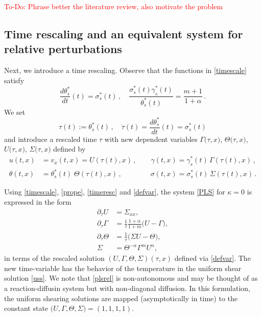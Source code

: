 \documentclass[a4paper,11pt]{article}
\newcommand{\tcr}{\textcolor{red}}
\theoremstyle{remark}
\begin{document}
\tcr{To-Do:  Phrase better the literature review, also motivate the problem}

\subsection{Time rescaling and an equivalent system for relative perturbations}
\label{sec:time}

Next, we introduce a time rescaling. Observe that the functions in \eqref{timescale} satisfy
\begin{equation}
\label{prope}
\frac{d \theta^*_s}{dt} (t) = \sigma^*_s (t)  \, , \quad \frac{\sigma^*_s (t) \gamma^*_s (t)}{\theta^*_s (t)} = \frac{m+1}{1+\alpha} \, .
\end{equation}
We set
\begin{equation}
\label{timeresc}
\tau (t) := \theta^*_s(t) \, , \quad \dot \tau (t) = \frac{d \theta^*_s}{dt} (t) = \sigma^*_s (t)
\end{equation}
and introduce a rescaled time $\tau$ with new dependent variables
$\Gamma\big(\tau,x\big)$, $\Theta\big(\tau,x\big)$, $U\big(\tau,x\big)$, $\Sigma\big(\tau,x\big)$ defined by
\begin{equation}
\label{defvar}
 \begin{aligned}
 u (t, x) &= v_x (t, x) = U(\tau(t), x) \, , \qquad \gamma(t,x) = \gamma^*_s(t) \, \Gamma (\tau (t), x)\, ,
 \\
\theta(t,x) &= \theta^*_s (t)  \; \Theta (\tau(t), x) \, , \qquad \qquad \sigma(t,x) = \sigma^*_s (t) \, \Sigma (\tau (t) , x)\,.
\end{aligned}
\end{equation}


Using \eqref{timescale}, \eqref{prope}, \eqref{timeresc} and \eqref{defvar}, the system \eqref{PLS} for  $\kappa = 0$ is
expressed in the form
\begin{equation} \label{plsrel}
 \begin{aligned}
  \partial_\tau U &= \Sigma_{xx},\\
  \partial_\tau \Gamma &= \frac{1}{\tau}\frac{1+\alpha}{1+m} \Big(U-\Gamma\Big),\\
  \partial_\tau \Theta &= \frac{1}{\tau}\Big(\Sigma U - \Theta\Big), \\
  \Sigma&=\Theta^{-\alpha}\Gamma^m U^n,
 \end{aligned}
\end{equation}
in terms of the rescaled solution $(U, \Gamma, \Theta, \Sigma)(\tau, x)$ defined via \eqref{defvar}. The new time-variable has the
behavior of the temperature in the uniform shear solution \eqref{uss}.
We note that \eqref{plsrel} is non-autonomous and may be thought of as a reaction-diffusin system but with non-diagonal diffusion.
In this formulation, the uniform shearing solutions are mapped  (asymptotically in time) to the constant state
$\big(U, \Gamma, \Theta,\Sigma \big)=(1,1,1,1)$.
\end{document}
